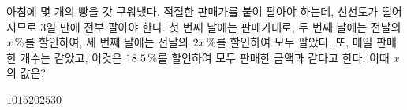아침에 몇 개의 빵을 갓 구워냈다. 적절한 판매가를 붙여 팔아야 하는데, 신선도가 떨어지므로 $3$일 만에 전부 팔아야 한다. 첫 번째 날에는 판매가대로, 두 번째 날에는 전날의 $x\mkern3mu \%$를 할인하여, 세 번째 날에는 전날의 $2x\mkern3mu \%$를 할인하여 모두 팔았다. 또, 매일 판매한 개수는 같았고, 이것은 $18.5\mkern3mu \%$를 할인하여 모두 판매한 금액과 같다고 한다. 이때 $x$의 값은?
\begin{choices32}{$10$}{$15$}{$20$}{$25$}{$30$}\end{choices32}
